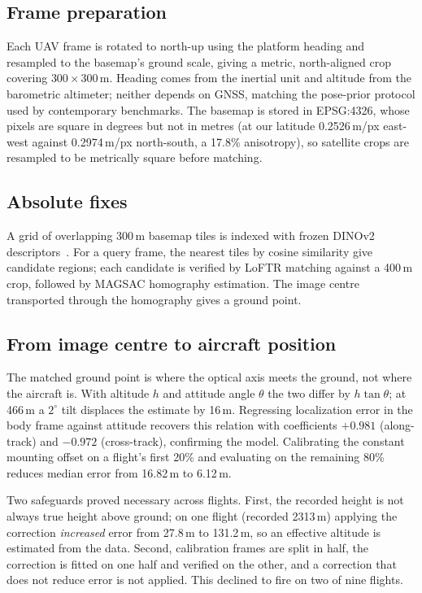 \documentclass[conference]{IEEEtran}
\begin{document}
\subsection{Frame preparation}
Each UAV frame is rotated to north-up using the platform heading and resampled
to the basemap's ground scale, giving a metric, north-aligned crop covering
$300 \times 300$\,m. Heading comes from the inertial unit and altitude from the
barometric altimeter; neither depends on GNSS, matching the pose-prior protocol
used by contemporary benchmarks. The basemap is stored in EPSG:4326, whose
pixels are square in degrees but not in metres (at our latitude
0.2526\,m/px east-west against 0.2974\,m/px north-south, a 17.8\% anisotropy),
so satellite crops are resampled to be metrically square before matching.

\subsection{Absolute fixes}
A grid of overlapping 300\,m basemap tiles is indexed with frozen DINOv2
descriptors~\cite{dinov2}. For a query frame, the nearest tiles by cosine
similarity give candidate regions; each candidate is verified by LoFTR matching
against a 400\,m crop, followed by MAGSAC homography estimation. The image
centre transported through the homography gives a ground point.

\subsection{From image centre to aircraft position}
\label{sec:boresight}
The matched ground point is where the optical axis meets the ground, not where
the aircraft is. With altitude $h$ and attitude angle $\theta$ the two differ
by $h\tan\theta$; at 466\,m a $2^\circ$ tilt displaces the estimate by 16\,m.
Regressing localization error in the body frame against attitude recovers this
relation with coefficients $+0.981$ (along-track) and $-0.972$ (cross-track),
confirming the model. Calibrating the constant mounting offset on a flight's
first 20\% and evaluating on the remaining 80\% reduces median error from
16.82\,m to 6.12\,m.

Two safeguards proved necessary across flights. First, the recorded height is
not always true height above ground; on one flight (recorded 2313\,m) applying
the correction \emph{increased} error from 27.8\,m to 131.2\,m, so an effective
altitude is estimated from the data. Second, calibration frames are split in
half, the correction is fitted on one half and verified on the other, and a
correction that does not reduce error is not applied. This declined to fire on
two of nine flights.
\end{document}
